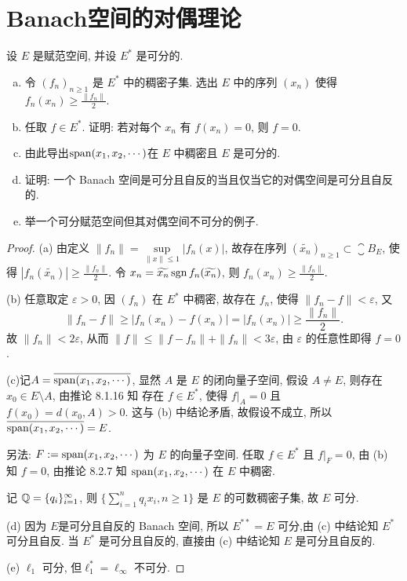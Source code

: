 \chapter{Banach空间的对偶理论}



\begin{exercise}
    设 $E$ 是赋范空间, 并设 $E^*$ 是可分的.
    \begin{enumerate}[(a)]
        \item 令 $(f_n)_{n\geq 1}$ 是 $E^*$ 中的稠密子集.
          选出 $E$ 中的序列 $(x_n)$ 使得 $f_n(x_n)\geq\frac{\|f_n\|}{2}$.
        \item 任取 $f\in E^*$. 证明: 若对每个 $x_n$ 有 $f(x_n)=0$, 则 $f=0$.
        \item 由此导出$\operatorname{span}(x_1, x_2, \cdots)$在 $E$ 中稠密且 $E$ 是可分的. 
        \item 证明: 一个 Banach 空间是可分且自反的当且仅当它的对偶空间是可分且自反的. 
        \item 举一个可分赋范空间但其对偶空间不可分的例子.
    \end{enumerate}
\end{exercise}

\begin{proof}
    (a) 由定义 $\|f_n\|=\sup\limits_{\|x\|\leq 1}|f_n(x)|$, 
    故存在序列 $(\widetilde{x_n})_{n\geq 1}\subset\closure{B_E}$, 
    使得 $|f_n(\widetilde{x_n})|\geq\frac{\|f_n\|}{2}$.
    令 $x_n=\widetilde{x_n}\operatorname{sgn} f_n(\widetilde{x_n})$, 则 $f_n(x_n)\geq\frac{\|f_n\|}{2}$.

    (b) 任意取定 $\varepsilon>0$, 因 $(f_n)$ 在 $E^*$ 中稠密, 
    故存在 $f_n$, 使得 $\|f_n-f\|<\varepsilon$, 又
    \[\|f_n-f\|\geq |f_n(x_n)-f(x_n)|=|f_n(x_n)|\geq\frac{\|f_n\|}{2}.\]
    故 $\|f_n\|<2\varepsilon$, 从而 $\|f\|\leq\|f-f_n\|+\|f_n\|<3\varepsilon$,
    由 $\varepsilon$ 的任意性即得 $f=0$.

    (c)记$A=\overline{\operatorname{span}(x_1,x_2,\cdots)}$, 显然 $A$ 是 $E$ 的闭向量子空间,
    假设 $A\neq E$, 则存在 $x_0\in E\setminus A$, 由推论 8.1.16 知
    存在 $f\in E^*$, 使得 $f|_A=0$ 且 $f(x_0)=d(x_0,A)>0$.
    这与 (b) 中结论矛盾, 故假设不成立, 所以 $\overline{\operatorname{span}(x_1,x_2,\cdots)}=E$.

    另法: $F:=\operatorname{span}(x_1,x_2,\cdots)$ 为 $E$ 的向量子空间. 任取 $f\in E^*$ 且 $f|_F=0$,
    由 (b) 知 $f=0$, 由推论 8.2.7 知 $\operatorname{span}(x_1,x_2,\cdots)$ 在 $E$ 中稠密.

    记 $\mathbb{Q}=\{q_i\}_{i=1}^{\infty}$, 
    则 $\{\sum_{i=1}^nq_ix_i,n\geq 1\}$ 是 $E$ 的可数稠密子集, 故 $E$ 可分.

    (d) \necessary
    因为 $E$是可分且自反的 Banach 空间, 所以 $E^{**}=E$ 可分,由 (c) 中结论知 $E^*$ 可分且自反.
    \sufficient
    当 $E^*$ 是可分且自反的, 直接由 (c) 中结论知 $E$ 是可分且自反的.

    (e) $\ell_1$ 可分, 但$\ell_1^*=\ell_{\infty}$ 不可分.
\end{proof}



